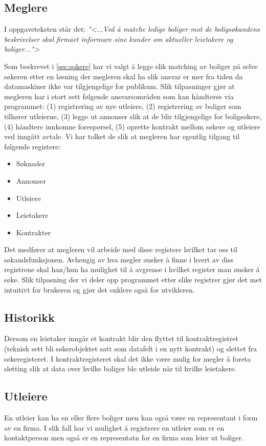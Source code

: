 \subsection{Meglere}
I oppgaveteksten står det:
\textit{"<...Ved å matche ledige boliger mot de boligsøkandens beskrivelser skal firmaet informare sine kunder om aktueller leietakere og boliger...">}

Som beskrevet i \ref{sec:sokere} har vi valgt å legge slik matching av boliger på selve søkeren etter en løsning der megleren skal ha slik ansvar er mer fra tiden da datamaskiner ikke var tilgjengelige for publikum. Slik tilpasninger gjør at megleren har i stort sett følgende ansvarsområden som kan håndteres via programmet: (1) registrering av nye utleiere, (2) registrering av boliger som tilhører utleierne, (3) legge ut annonser slik at de blir tilgjengelige for boligsøkere, (4) håndtere innkomne forespørsel, (5) oprette kontrakt mellom søkere og utleiere ved inngått avtale. 
Vi har tolket de slik at megleren har egentlig tilgang til følgende registere:
\begin{itemize}
\item Søknader
\item Annonser
\item Utleiere
\item Leietakere
\item Kontrakter
\end{itemize}
Det medfører at megleren vil arbeide med disse registere hvilket tar oss til søkandsfunksjonen. Avhengig av hva megler ønsker å finne i hvert av diss registrene skal han/hun ha mulighet til å avgrense i hvilket register man ønsker å søke. Slik tilpasning der vi deler opp programmet etter slike registrer gjør det met intuitivt for brukeren og gjør det enklere også for utvikleren.

\subsection{Historikk}
Dersom en leietaker inngår et kontrakt blir den flyttet til kontraktregistret (teknisk sett bli søkerobjektet satt som datafelt i en nytt kontrakt) og slettet fra søkeregisteret. I kontraktregisteret skal det ikke være mulig for megler å foreta sletting slik at data over hvilke boliger ble utleide når til hvilke leietakere. 

\subsection{Utleiere}
En utleier kan ha en eller flere boliger men kan også være en representant i form av en firma. I slik fall har vi mulighet å registrere en utleier som er en kontaktperson men også er en representatn for en firma som leier ut boliger.

